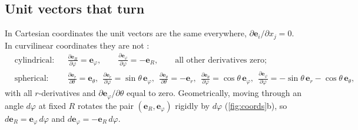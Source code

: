 \documentclass[11pt,letterpaper]{article}
\numberwithin{equation}{section}
\newcommand{\e}[1]{\mathbf{e}_{#1}}
\newcommand{\pd}[2]{\frac{\partial #1}{\partial #2}}
\begin{document}
\subsection{Unit vectors that turn}
In Cartesian coordinates the unit vectors are the same everywhere, $\partial\e{i}/\partial x_j=0$. In curvilinear coordinates
they are not \citep[pp.~893--894]{kundu2016}:
\begin{align}
&\text{cylindrical:} && \pd{\e{R}}{\varphi}=\e{\varphi},\qquad \pd{\e{\varphi}}{\varphi}=-\e{R},\qquad\text{all other derivatives zero;}\label{eq:cylderiv}\\
&\text{spherical:} && \pd{\e{r}}{\theta}=\e{\theta},\ \ \pd{\e{r}}{\varphi}=\sin\theta\,\e{\varphi},\ \
\pd{\e{\theta}}{\theta}=-\e{r},\ \ \pd{\e{\theta}}{\varphi}=\cos\theta\,\e{\varphi},\ \
\pd{\e{\varphi}}{\varphi}=-\sin\theta\,\e{r}-\cos\theta\,\e{\theta},\label{eq:sphderiv}
\end{align}
with all $r$-derivatives and $\partial\e{\varphi}/\partial\theta$ equal to zero. Geometrically, moving through an angle $d\varphi$ at
fixed $R$ rotates the pair $(\e{R},\e{\varphi})$ rigidly by $d\varphi$ (\cref{fig:coords}b), so $d\e{R}=\e{\varphi}\,d\varphi$ and
$d\e{\varphi}=-\e{R}\,d\varphi$.
\end{document}
